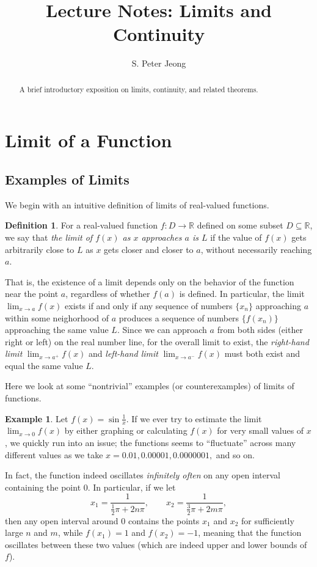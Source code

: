 \documentclass[11pt,oneside,reqno]{amsart}
\title{Lecture Notes: Limits and Continuity}
\author[sdf]{S. Peter Jeong}
\newcommand\R{{\mathbb R}}
\numberwithin{equation}{section}
\theoremstyle{definition}
\newtheorem{definition}[theorem]{Definition}
\newtheorem{example}[theorem]{Example}
\theoremstyle{remark}
\begin{document}
\begin{abstract}
    A brief introductory exposition on limits, continuity, and related theorems.
\end{abstract}
\maketitle
\section{Limit of a Function}

\subsection{Examples of Limits} We begin with an intuitive definition of limits of real-valued functions. 
\begin{definition}
    For a real-valued function $f:D\to\R$ defined on some subset $D \subseteq \R$, we say that \textit{the limit of $f(x)$ as $x$ approaches $a$ is $L$} if the value of $f(x)$ gets arbitrarily close to $L$ as $x$ gets closer and closer to $a$, without necessarily reaching $a$. 
\end{definition}
That is, the existence of a limit depends only on the behavior of the function near the point $a$, regardless of whether $f(a)$ is defined. In particular, the limit $\lim_{x\to a} f(x)$ exists if and only if any sequence of numbers $\{x_n\}$ approaching $a$ within some neighorhood of $a$
produces a sequence of numbers $\{f(x_n)\}$ approaching the same value $L$. Since we can approach $a$ from both sides (either right or left) on the real number line, for the overall limit to exist, 
the \textit{right-hand limit} $\lim_{x\to a^+} f(x)$ and \textit{left-hand limit} $\lim_{x\to a^-} f(x)$ must both exist and equal the same value $L$. 

Here we look at some ``nontrivial'' examples (or counterexamples) of limits of functions. 
\begin{example}\label{example:sine}
    Let $f(x) = \sin \frac{1}{x}$. If we ever try to estimate the limit $\lim_{x\to0} f(x)$ by either graphing or calculating $f(x)$ for very small values of $x$, we quickly run into an issue; the functions seems to ``fluctuate'' across many different values as we take $x = 0.01, 0.00001, 0.0000001,$ and so on. 
    
    In fact, the function indeed oscillates \textit{infinitely often} on any open interval containing the point $0$. In particular, if we let 
    \[x_1 = \frac{1}{\frac{1}{2}\pi+2n\pi}, \qquad x_2 = \frac{1}{\frac{3}{2}\pi + 2m\pi},\]
    then any open interval around $0$ contains the points $x_1$ and $x_2$ for sufficiently large $n$ and $m$, while $f(x_1) = 1$ and $f(x_2) = -1$, meaning that the function oscillates between these two values (which are indeed upper and lower bounds of $f$). 
\end{example}
\end{document}
